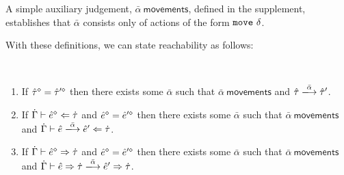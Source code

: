 A simple auxiliary judgement, $\bar\alpha~\mathsf{movements}$, defined in the supplement, establishes that $\bar\alpha$ consists only of actions of the form $\mathtt{move}~\delta$.

With these definitions, we can state reachability as follows:

\begin{theorem}[Reachability]\label{thrm:reachability} ~
\begin{enumerate}[itemsep=0px,partopsep=0px,topsep=0px]
\item If $\hat{\tau}^{\diamond}=\hat{\tau}'^{\diamond}$ then there exists some $\bar\alpha$ such that $\bar{\alpha}~\mathsf{movements}$ and $\performTyp{\ztau}{\bar\alpha}{\ztau'}$.
\item If $\dot{\Gamma} \vdash \hat{e}^{\diamond} \Leftarrow \dot{\tau}$ and $\hat{e}^{\diamond}=\hat{e}'^{\diamond}$ then there exists some $\bar{\alpha}$ such that $\bar{\alpha}~\mathsf{movements}$ and $\performAna{\hGamma}{\zexp}{\htau}{\bar{\alpha}}{\zexp'}$. 
\item If $\dot{\Gamma} \vdash \hat{e}^{\diamond} \Rightarrow \dot{\tau}$ and $\hat{e}^{\diamond}=\hat{e}'^{\diamond}$ then there exists some $\bar{\alpha}$ such that $\bar{\alpha}~\mathsf{movements}$ and $\performSyn{\hGamma}{\zexp}{\htau}{\bar\alpha}{\zexp'}{\htau}$.
\end{enumerate}
\end{theorem}


